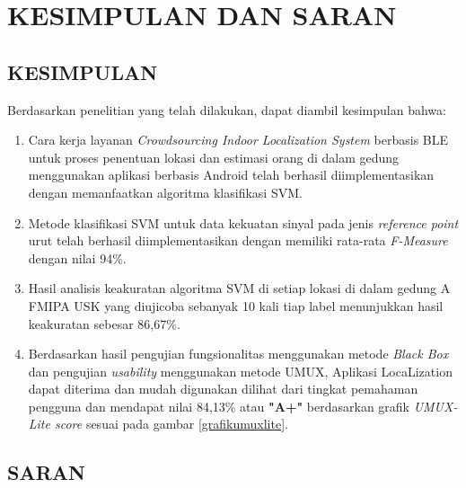 \fancyhf{}
\fancyfoot[C]{\thepage}
\chapter{KESIMPULAN DAN SARAN}

\section{\uppercase{KESIMPULAN}}
Berdasarkan penelitian yang telah dilakukan, dapat diambil kesimpulan bahwa:
\begin{enumerate}
	\item Cara kerja layanan \textit{Crowdsourcing Indoor Localization System} berbasis BLE untuk proses penentuan lokasi dan estimasi orang di dalam gedung menggunakan aplikasi berbasis Android telah berhasil diimplementasikan dengan memanfaatkan algoritma klasifikasi SVM.
	\item Metode klasifikasi SVM untuk data kekuatan sinyal pada jenis \textit{reference point} urut telah berhasil diimplementasikan dengan memiliki rata-rata \textit{F-Measure} dengan nilai 94\%.
	\item Hasil analisis keakuratan algoritma SVM di setiap lokasi di dalam gedung A FMIPA USK yang diujicoba sebanyak 10 kali tiap label menunjukkan hasil keakuratan sebesar 86,67\%.
	\item Berdasarkan hasil pengujian fungsionalitas menggunakan metode \textit{Black Box} dan pengujian \textit{usability} menggunakan metode UMUX, Aplikasi LocaLization dapat diterima dan mudah digunakan dilihat dari tingkat pemahaman pengguna dan mendapat nilai 84,13\% atau \textbf{"A+"} berdasarkan grafik \textit{UMUX-Lite score} sesuai pada gambar \ref{grafikumuxlite}.
\end{enumerate}



\section{\uppercase{SARAN}}

